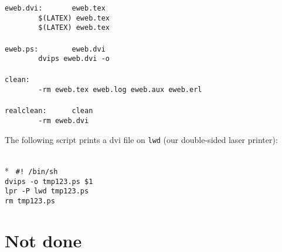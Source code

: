 \begin{flushleft}
\verb&eweb.dvi:       eweb.tex&\\
\noindent{}%
\verb&        $(LATEX) eweb.tex&\\
\noindent{}%
\verb&        $(LATEX) eweb.tex&\\
\noindent{}%
\verb&&\\
\noindent{}%
\verb&eweb.ps:        eweb.dvi&\\
\noindent{}%
\verb&        dvips eweb.dvi -o&\\
\noindent{}%
\verb&&\\
\noindent{}%
\verb&clean:&\\
\noindent{}%
\verb&        -rm eweb.tex eweb.log eweb.aux eweb.erl&\\
\noindent{}%
\verb&&\\
\noindent{}%
\verb&realclean:      clean&\\
\noindent{}%
\verb&        -rm eweb.dvi&\\
\end{flushleft}

The following script prints a dvi file on \verb+lwd+ (our double-sided
laser printer):

\begin{flushleft}
\label{dviprint_double_sided_start}
\\*
\tt
\noindent{}%
\verb&#! /bin/sh&\\
\noindent{}%
\verb&dvips -o tmp123.ps $1&\\
\noindent{}%
\verb&lpr -P lwd tmp123.ps&\\
\noindent{}%
\verb&rm tmp123.ps&\\
\end{flushleft}

\section*{Not done}

